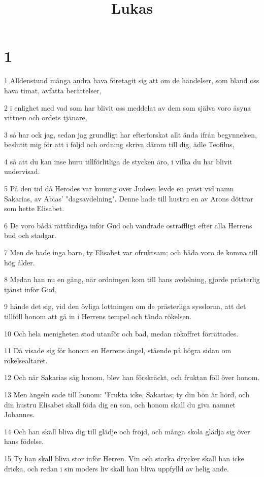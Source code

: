 

\title{Lukas}


\chapter{1}

\par 1 Alldenstund många andra hava företagit sig att om de händelser, som bland oss hava timat, avfatta berättelser,
\par 2 i enlighet med vad som har blivit oss meddelat av dem som själva voro åsyna vittnen och ordets tjänare,
\par 3 så har ock jag, sedan jag grundligt har efterforskat allt ända ifrån begynnelsen, beslutit mig för att i följd och ordning skriva därom till dig, ädle Teofilus,
\par 4 så att du kan inse huru tillförlitliga de stycken äro, i vilka du har blivit undervisad.
\par 5 På den tid då Herodes var konung över Judeen levde en präst vid namn Sakarias, av Abias' "dagsavdelning". Denne hade till hustru en av Arons döttrar som hette Elisabet.
\par 6 De voro båda rättfärdiga inför Gud och vandrade ostraffligt efter alla Herrens bud och stadgar.
\par 7 Men de hade inga barn, ty Elisabet var ofruktsam; och båda voro de komna till hög ålder.
\par 8 Medan han nu en gång, när ordningen kom till hans avdelning, gjorde prästerlig tjänst inför Gud,
\par 9 hände det sig, vid den övliga lottningen om de prästerliga sysslorna, att det tillföll honom att gå in i Herrens tempel och tända rökelsen.
\par 10 Och hela menigheten stod utanför och bad, medan rökoffret förrättades.
\par 11 Då visade sig för honom en Herrens ängel, stående på högra sidan om rökelsealtaret.
\par 12 Och när Sakarias såg honom, blev han förskräckt, och fruktan föll över honom.
\par 13 Men ängeln sade till honom: "Frukta icke, Sakarias; ty din bön är hörd, och din hustru Elisabet skall föda dig en son, och honom skall du giva namnet Johannes.
\par 14 Och han skall bliva dig till glädje och fröjd, och många skola glädja sig över hans födelse.
\par 15 Ty han skall bliva stor inför Herren. Vin och starka drycker skall han icke dricka, och redan i sin moders liv skall han bliva uppfylld av helig ande.
